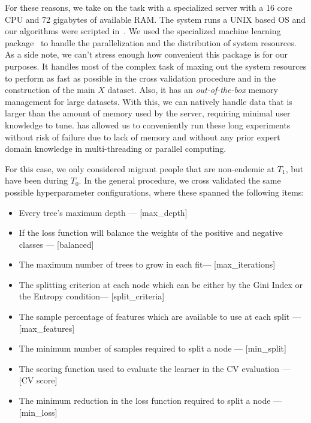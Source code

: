 For these reasons, we take on the task with a specialized server with a 16 core CPU and 72 gigabytes of available RAM.\@
The system runs a UNIX based OS and our algorithms were scripted in~\cite{python3.5}.
We used the specialized machine learning package~\cite{graphlab} to handle the parallelization and the distribution of system resources.
As a side note, we can't stress enough how convenient this package is for our purposes.
It handles most of the complex task of maxing out the system resources to perform as fast as possible in the cross validation procedure and in the construction of the main $X$ dataset.
Also, it has an \textit{out-of-the-box} memory management for large datasets.
With this, we can natively handle data that is larger than the amount of memory used by the server, requiring minimal user knowledge to tune.
\cite{graphlab} has allowed us to conveniently run these long experiments without risk of failure due to lack of memory and without any prior expert domain knowledge in multi-threading or parallel computing.

For this case, we only considered migrant people that are non-endemic at $T_1$, but have been during $T_0$.
In the general procedure, we cross validated the same possible hyperparameter configurations, where these spanned the following items:

\begin{itemize}\label{list:random_forest_grid_search_params}

  \item Every tree's maximum depth --- [max\_depth]
  \item If the loss function will balance the weights of the positive and negative classes --- [balanced]
  \item The maximum number of trees to grow in each fit--- [max\_iterations]
  \item The splitting criterion at each node which can be either by the Gini Index or the Entropy condition--- [split\_criteria]
  \item The sample percentage of features which are available to use at each split --- [max\_features]
  \item The minimum number of samples required to split a node --- [min\_split]
  \item The scoring function used to evaluate the learner in the CV evaluation --- [CV score]
  \item The minimum reduction in the loss function required to split a node  --- [min\_loss]
\end{itemize}



